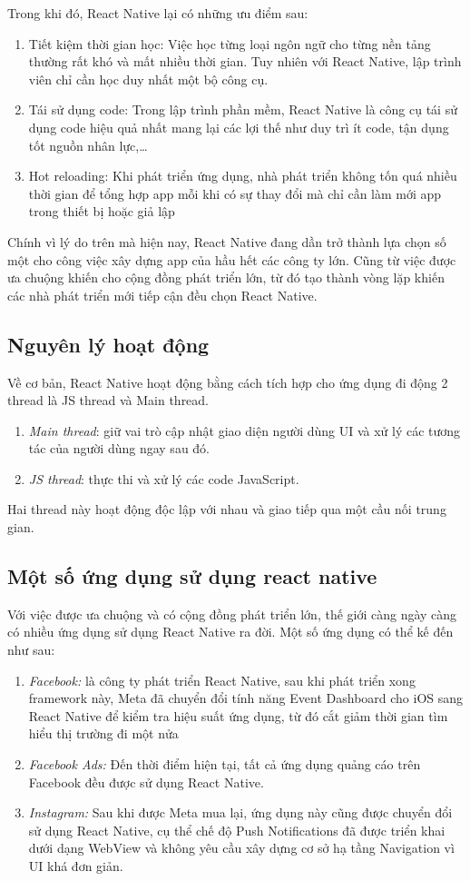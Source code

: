 Trong khi đó, React Native lại có những ưu điểm sau:
\begin{enumerate}
    \item {Tiết kiệm thời gian học:} Việc học từng loại ngôn ngữ cho từng nền tảng thường rất khó và mất nhiều thời gian. Tuy nhiên với React Native, lập trình viên chỉ cần học duy nhất một bộ công cụ.
    \item {Tái sử dụng code:} Trong lập trình phần mềm, React Native là công cụ tái sử dụng code hiệu quả nhất mang lại các lợi thế như duy trì ít code, tận dụng tốt nguồn nhân lực,\dots
    \item {Hot reloading:} Khi phát triển ứng dụng, nhà phát triển không tốn quá nhiều thời gian để tổng hợp app mỗi khi có sự thay đổi mà chỉ cần làm mới app trong thiết bị hoặc giả lập
\end{enumerate}
Chính vì lý do trên mà hiện nay, React Native  đang dần trở thành lựa chọn số một cho công việc xây dựng app của hầu hết các công ty lớn. Cũng từ việc được ưa chuộng khiến cho cộng đồng phát triển lớn, từ đó tạo thành vòng lặp khiến các nhà phát triển mới tiếp cận đều chọn React Native.

\subsection{Nguyên lý hoạt động}
Về cơ bản, React Native hoạt động bằng cách tích hợp cho ứng dụng đi động 2 thread là JS thread và Main thread.
\begin{enumerate}
    \item{\textit{Main thread}}: giữ vai trò cập nhật giao diện người dùng UI và xử lý các tương tác của người dùng ngay sau đó.
    \item{\textit{JS thread}}: thực thi và xử lý các code JavaScript.
\end{enumerate}
Hai thread này hoạt động độc lập với nhau và giao tiếp qua một cầu nối trung gian.

\subsection{Một số ứng dụng sử dụng react native}
Với việc được ưa chuộng và có cộng đồng phát triển lớn, thế giới càng ngày càng có nhiều ứng dụng sử dụng React Native ra đời. Một số ứng dụng có thể kế đến như sau:
\begin{enumerate}
    \item {\textit{Facebook:}} là công ty phát triển React Native, sau khi phát triển xong framework này, Meta đã chuyển đổi tính năng Event Dashboard cho iOS sang React Native để kiểm tra hiệu suất ứng dụng, từ đó cắt giảm thời gian tìm hiểu thị trường đi một nửa
    \item {\textit{Facebook Ads:}} Đến thời điểm hiện tại, tất cả ứng dụng quảng cáo trên Facebook đều được sử dụng React Native.
    \item {\textit{Instagram:}} Sau khi được Meta mua lại, ứng dụng này cũng được chuyển đổi sử dụng React Native, cụ thể chế độ Push Notifications đã được triển khai dưới dạng WebView và không yêu cầu xây dựng cơ sở hạ tầng Navigation vì UI khá đơn giản.
\end{enumerate}
